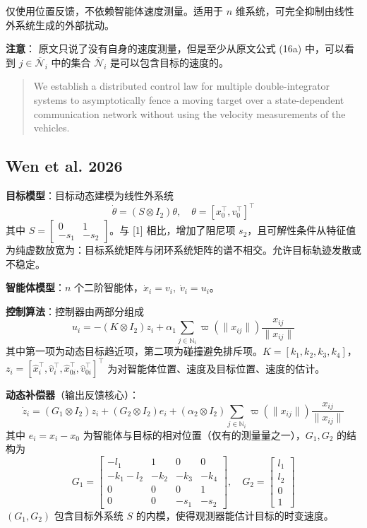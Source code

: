 仅使用位置反馈，不依赖智能体速度测量。适用于 $n$ 维系统，可完全抑制由线性外系统生成的外部扰动。

\textbf{注意}： 原文只说了没有自身的速度测量，但是至少从原文公式 (16a) 中，可以看到 $j\in \overline{\mathcal{N}}_i$ 中的集合 $\overline{\mathcal{N}}_i$ 是可以包含目标的速度的。

\begin{quote}
We establish a distributed control law for multiple double-integrator systems to asymptotically fence a moving target over a state-dependent communication network without using the velocity measurements of the vehicles.
\end{quote}

\subsection{Wen et al. 2026}

\textbf{目标模型}：目标动态建模为线性外系统
\[
\dot{\theta} = (S \otimes I_2)\theta, \quad \theta = [x_0^\top, v_0^\top]^\top
\]
其中 $S = \begin{bmatrix} 0 & 1 \\ -s_1 & -s_2 \end{bmatrix}$。与 [1] 相比，增加了阻尼项 $s_2$，且可解性条件从特征值为纯虚数放宽为：目标系统矩阵与闭环系统矩阵的谱不相交。允许目标轨迹发散或不稳定。

\textbf{智能体模型}：$n$ 个二阶智能体，$\dot{x}_i = v_i,\; \dot{v}_i = u_i$。

\textbf{控制算法}：控制器由两部分组成
\[
u_i = -(K \otimes I_2) z_i + \alpha_1 \sum_{j \in \mathbb{N}_i} \varpi(\|x_{ij}\|) \frac{x_{ij}}{\|x_{ij}\|}
\]
其中第一项为动态目标趋近项，第二项为碰撞避免排斥项。$K = [k_1, k_2, k_3, k_4]$，$z_i = [\hat{x}_i^\top, \hat{v}_i^\top, \hat{x}_{0i}^\top, \hat{v}_{0i}^\top]^\top$ 为对智能体位置、速度及目标位置、速度的估计。

\textbf{动态补偿器}（输出反馈核心）：
\[
\dot{z}_i = (G_1 \otimes I_2) z_i + (G_2 \otimes I_2) e_i + (\alpha_2 \otimes I_2) \sum_{j \in \mathbb{N}_i} \varpi(\|x_{ij}\|) \frac{x_{ij}}{\|x_{ij}\|}
\]
其中 $e_i = x_i - x_0$ 为智能体与目标的相对位置（仅有的测量量之一），$G_1, G_2$ 的结构为
\[
G_1 = \begin{bmatrix} -l_1 & 1 & 0 & 0 \\ -k_1 - l_2 & -k_2 & -k_3 & -k_4 \\ 0 & 0 & 0 & 1 \\ 0 & 0 & -s_1 & -s_2 \end{bmatrix}, \quad G_2 = \begin{bmatrix} l_1 \\ l_2 \\ 0 \\ 1 \end{bmatrix}
\]
$(G_1, G_2)$ 包含目标外系统 $S$ 的内模，使得观测器能估计目标的时变速度。


